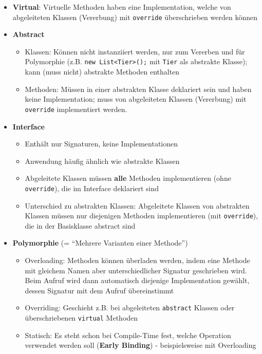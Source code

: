 \documentclass[a4paper, 11pt]{article}
\begin{document}
\begin{itemize}
\begin{itemize}
	      \end{itemize}
	\item \textbf{Virtual}: Virtuelle Methoden haben eine Implementation, welche von abgeleiteten Klassen (Vererbung) mit \texttt{override} überschrieben werden können
	\item \textbf{Abstract}
	      \begin{itemize}
		      \item Klassen: Können nicht instanziiert werden, nur zum Vererben und für Polymorphie (z.B. \texttt{new List<Tier>();} mit \texttt{Tier} als abstrakte Klasse); kann (muss nicht) abstrakte Methoden enthalten
		      \item Methoden: Müssen in einer abstrakten Klasse deklariert sein und haben keine Implementation; muss von abgeleiteten Klassen (Vererbung) mit \texttt{override} implementiert werden.
	      \end{itemize}
	\item \textbf{Interface}
	      \begin{itemize}
		      \item Enthält nur Signaturen, keine Implementationen
		      \item Anwendung häufig ähnlich wie abstrakte Klassen
		      \item Abgeleitete Klassen müssen \textbf{alle} Methoden implementieren (ohne \texttt{override}), die im Interface deklariert sind
		      \item Unterschied zu abstrakten Klassen: Abgeleitete Klassen von abstrakten Klassen müssen nur diejenigen Methoden implementieren (mit \texttt{override}), die in der Basisklasse abstract sind
	      \end{itemize}
	\item \textbf{Polymorphie} (= \enquote{Mehrere Varianten einer Methode})
	      \begin{itemize}
		      \item Overloading: Methoden können überladen werden, indem eine Methode mit gleichem Namen aber unterschiedlicher Signatur geschrieben wird. Beim Aufruf wird dann automatisch diejenige Implementation gewählt, dessen Signatur mit dem Aufruf übereinstimmt
		      \item Overriding: Geschieht z.B. bei abgeleiteten \texttt{abstract} Klassen oder überschriebenen \texttt{virtual} Methoden
		      \item Statisch: Es steht schon bei Compile-Time fest, welche Operation verwendet werden soll (\textbf{Early Binding}) - beispielsweise mit Overloading

\end{itemize}
\end{itemize}
\end{document}
